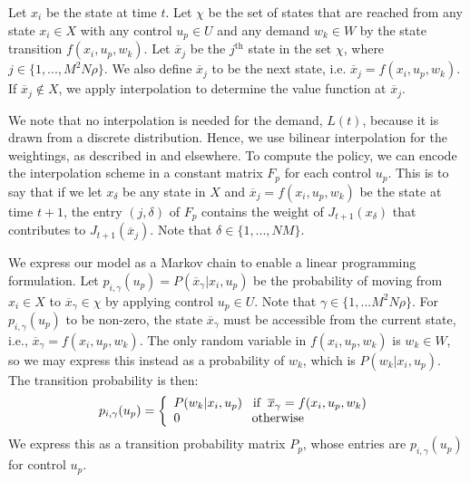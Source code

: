 \documentclass[conference]{IEEEtran}
\begin{document}
Let $x_{i}$ be the state at time $t$. Let $\chi$ be the set of states that are reached from any state $x_{i}\in X$ with any control $u_{p}\in U$ and any demand $w_{k}\in W$ by the state transition $f(x_{i},u_{p},w_{k})$. Let $\overline{x}_{j}$ be the $j^{\text{th}}$ state in the set $\chi$, where $j\in \{1,...,M^{2}N\rho\}$. We also define $\overline{x}_{j}$ to be the next state, i.e. $\overline{x}_{j}=f(x_{i},u_{p},w_{k})$. If $\overline{x}_{j}\not\in X$, we apply interpolation to determine the value function at $\overline{x}_{j}$.

We note that no interpolation is needed for the demand, $L(t)$, because it is drawn from a discrete distribution. Hence, we use bilinear interpolation for the weightings, as described in \cite[p.~319]{MultiLinInterp} and elsewhere. To  compute the policy, we can encode the interpolation scheme in a constant matrix $F_{p}$ for each control $u_{p}$. This is to say that if we let $x_{\delta}$ be any state in $X$ and $\overline{x}_{j}=f(x_{i},u_{p},w_{k})$ be the state at time $t+1$, the entry $(j,\delta)$ of $F_{p}$ contains the weight of $J_{t+1}(x_{\delta})$ that contributes to $J_{t+1}(\overline{x}_{j})$. Note that $\delta\in\{1,...,NM\}$.

We express our model as a Markov chain to enable a linear programming formulation. Let $p_{i,\gamma}(u_{p})=P(\overline{x}_{\gamma}| x_{i},u_{p})$ be the probability of moving from $x_{i}\in X$ to $\overline{x}_{\gamma}\in \chi$ by applying control $u_{p}\in U$. Note that $\gamma\in\{1,...M^{2}N\rho\}$. For $p_{i,\gamma}(u_{p})$ to be non-zero, the state $\overline{x}_{\gamma}$ must be accessible from the current state, i.e., $\overline{x}_{\gamma}=f(x_{i},u_{p},w_{k})$. The only random variable in $f(x_{i},u_{p},w_{k})$ is $w_{k}\in W$, so we may express this instead as a probability of $w_{k}$, which is $P(w_{k} | x_{i},u_{p})$. The transition probability is then:
\begin{equation} \label{eq:TransMtx}
p_{i,\gamma}(u_{p})=
\left\{
\begin{array}{l}
P(w_{k}|x_{i},u_{p}) \hspace{0.3cm} \text{if} \hspace{0.2cm} \overline{x}_{\gamma}=f(x_{i},u_{p},w_{k})\\
0 \hspace{2.0cm} \text{otherwise}
\end{array}
\right.
\end{equation} We express this as a transition probability matrix $P_{p}$, whose entries are $p_{i,\gamma}(u_{p})$ for control $u_{p}$.
\end{document}
